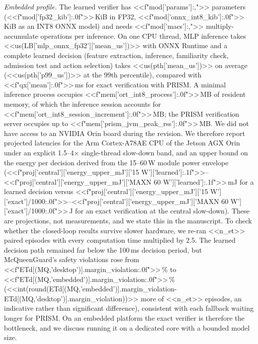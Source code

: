 \documentclass[11pt]{article}
\begin{document}
\emph{Embedded profile.} The learned verifier has <<f"{mod['params']:,}">> parameters (<<f"{mod['fp32_kib']:.0f}">>\,KiB in
FP32, <<f"{mod['onnx_int8_kib']:.0f}">>\,KiB as an INT8 ONNX model) and needs <<f"{mod['macs']:,}">> multiply-accumulate
operations per inference. On one CPU thread, MLP inference takes <<us(LB['mlp_onnx_fp32']['mean_us'])>> with ONNX Runtime and
a complete learned decision (feature extraction, inference, familiarity check, admission test and action selection) takes
<<us(pth['mean_us'])>> on average (<<us(pth['p99_us'])>> at the 99th percentile), compared with <<f"{qx['mean']:.0f}">>\,ms for exact
verification with PRISM. A minimal inference process occupies <<f"{mem['ort_int8_process']:.0f}">>\,MB of resident memory,
of which the inference session accounts for <<f"{mem['ort_int8_session_increment']:.0f}">>\,MB; the PRISM verification
server occupies up to <<f"{mem['prism_jvm_peak_rss']:.0f}">>\,MB. We did not have access to an NVIDIA Orin board during the
revision. We therefore report projected latencies for the Arm Cortex-A78AE CPU of the Jetson AGX Orin under an explicit
1.5--4$\times$ single-thread slow-down band, and an upper bound on the energy per decision derived from the 15--60\,W module
power envelope (<<f"{proj['central']['energy_upper_mJ']['15 W']['learned']:.1f}">>--<<f"{proj['central']['energy_upper_mJ']['MAXN 60 W']['learned']:.1f}">>\,mJ for a
learned decision versus <<f"{proj['central']['energy_upper_mJ']['15 W']['exact']/1000:.0f}">>--<<f"{proj['central']['energy_upper_mJ']['MAXN 60 W']['exact']/1000:.0f}">>\,J for an exact
verification at the central slow-down). These are projections, not measurements, and we state this in the manuscript. To check
whether the closed-loop results survive slower hardware, we re-ran <<n_et>> paired episodes with every computation time
multiplied by 2.5. The learned decision path remained far below the 100\,ms decision period, but McQueenGuard's safety
violations rose from <<f"{ETd[(MQ,'desktop')].margin_violation:.0f}">>\,\% to <<f"{ETd[(MQ,'embedded')].margin_violation:.0f}">>\,\%
(<<int(round(ETd[(MQ,'embedded')].margin_violation-ETd[(MQ,'desktop')].margin_violation))>> more of <<n_et>> episodes, an indicative rather than significant
difference), consistent with each fallback waiting longer for PRISM. On an embedded platform the exact verifier is therefore the bottleneck, and we
discuss running it on a dedicated core with a bounded model size.
\end{document}
